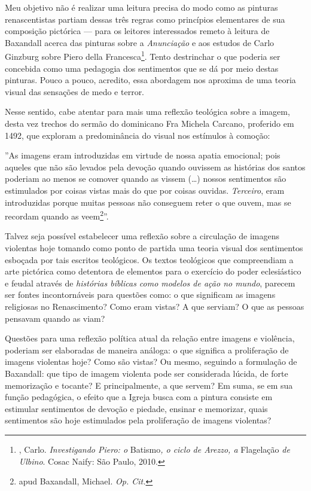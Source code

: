 Meu objetivo não é realizar uma leitura precisa do modo como as pinturas
renascentistas partiam dessas três regras como princípios elementares de
sua composição pictórica --- para os leitores interessados remeto à
leitura de Baxandall acerca das pinturas sobre a \emph{Anunciação} e aos
estudos de Carlo Ginzburg sobre Piero della Francesca\footnote{,
  Carlo. \emph{Investigando Piero: o} Batismo\emph{, o ciclo de Arezzo,
  a} Flagelação \emph{de Ulbino}. Cosac Naify: São Paulo, 2010.}. Tento
destrinchar o que poderia ser concebida como uma pedagogia dos
sentimentos que se dá por meio destas pinturas. Pouco a pouco, acredito,
essa abordagem nos aproxima de uma teoria visual das sensações de medo e
terror.

Nesse sentido, cabe atentar para mais uma reflexão teológica sobre a
imagem, desta vez trechos do sermão do dominicano Fra Michela Carcano,
proferido em 1492, que exploram a predominância do visual nos estímulos
à comoção:

''As imagens eram introduzidas em virtude de nossa apatia
emocional; pois aqueles que não são levados pela devoção quando ouvissem
as histórias dos santos poderiam ao menos se comover quando as vissem
(\ldots{}) nossos sentimentos são estimulados por coisas vistas mais do que
por coisas ouvidas. \emph{Terceiro}, eram introduzidas porque muitas
pessoas não conseguem reter o que ouvem, mas se recordam quando as
veem\footnote{ apud Baxandall, Michael. \emph{Op. Cit.}}''.

Talvez seja possível estabelecer uma reflexão sobre a circulação de
imagens violentas hoje tomando como ponto de partida uma teoria visual
dos sentimentos esboçada por tais escritos teológicos. Os textos
teológicos que compreendiam a arte pictórica como detentora de elementos
para o exercício do poder eclesiástico e feudal através de
\emph{histórias bíblicas como modelos de ação no mundo}, parecem ser
fontes incontornáveis para questões como: o que significam as imagens
religiosas no Renascimento? Como eram vistas? A que serviam? O que as
pessoas pensavam quando as viam?

Questões para uma reflexão política atual da relação entre imagens e
violência, poderiam ser elaboradas de maneira análoga: o que significa a
proliferação de imagens violentas hoje? Como são vistas? Ou mesmo,
seguindo a formulação de Baxandall: que tipo de imagem violenta pode ser
considerada lúcida, de forte memorização e tocante? E principalmente, a
que servem? Em suma, se em sua função pedagógica, o efeito que a Igreja
busca com a pintura consiste em estimular sentimentos de devoção e
piedade, ensinar e memorizar, quais sentimentos são hoje estimulados
pela proliferação de imagens violentas?


